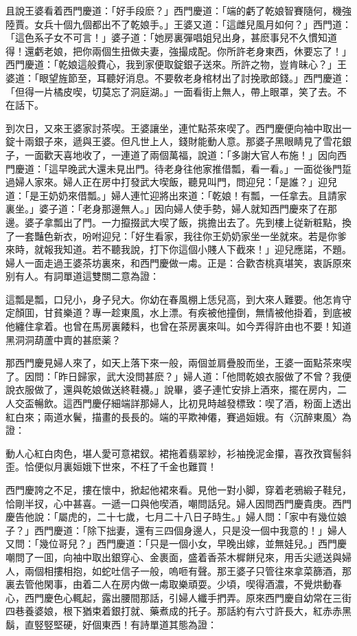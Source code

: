 且說王婆看着西門慶道：「好手段麽？」西門慶道：「端的虧了乾娘智賽隨何，機強陸賈。女兵十個九個都出不了乾娘手。」王婆又道：「這雌兒風月如何？」西門道：「這色系子女不可言！」婆子道：「她房裏彈唱姐兒出身，甚麽事兒不久慣知道得！還虧老娘，把你兩個生扭做夫妻，強撮成配。你所許老身東西，休要忘了！」西門慶道：「乾娘這般費心，我到家便取錠銀子送來。所許之物，豈肯昧心？」王婆道：「眼望旌節至，耳聽好消息。不要敎老身棺材出了討挽歌郎錢。」西門慶道：「但得一片橘皮喫，切莫忘了洞庭湖。」一面看街上無人，帶上眼罩，笑了去。不在話下。

到次日，又來王婆家討茶喫。王婆讓坐，連忙點茶來喫了。西門慶便向袖中取出一錠十兩銀子來，遞與王婆。但凡世上人，錢財能動人意。那婆子黑眼睛見了雪花銀子，一面歡天喜地收了，一連道了兩個萬福，說道：「多謝大官人布施！」因向西門慶道：「這早晚武大還未見出門。待老身往他家推借瓢，看一看。」一面從後門踅過婦人家來。婦人正在房中打發武大喫飯，聽見叫門，問迎兒：「是誰？」迎兒道：「是王奶奶來借瓢。」婦人連忙迎將出來道：「乾娘！有瓢，一任拿去。且請家裏坐。」婆子道：「老身那邊無人。」因向婦人使手勢，婦人就知西門慶來了在那邊。婆子拿瓢出了門。一力攛掇武大喫了飯，挑擔出去了。先到樓上従新粧點，換了一套豔色新衣，吩咐迎兒：「好生看家，我往你王奶奶家坐一坐就來。若是你爹來時，就報我知道。若不聽我說，打下你這個小賤人下截來！」迎兒應諾，不題。婦人一面走過王婆茶坊裏來，和西門慶做一䖏。正是：合歡杏桃真堪笑，衷訴原來别有人。有詞單道這雙關二意為證：

這瓢是瓢，口兒小，身子兒大。你幼在春風棚上恁兒高，到大來人難要。他怎肯守定顏囬，甘貧樂道？專一趁東風，水上漂。有疾被他撞倒，無情被他掛着，到底被他纏住拿着。也曾在馬房裏餧料，也曾在茶房裏來叫。如今弄得許由也不要！知道黑洞洞葫蘆中賣的甚麽薬？

那西門慶見婦人來了，如天上落下來一般，兩個並肩疊股而坐，王婆一面點茶來喫了。因問：「昨日歸家，武大没問甚麽？」婦人道：「他問乾娘衣服做了不曾？我便說衣服做了，還與乾娘做送終鞋襪。」說畢，婆子連忙安排上酒來，擺在房内，二人交盃暢飲。這西門慶仔細端詳那婦人，比初見時越發標致：喫了酒，粉面上透出紅白來；兩道水鬢，描畫的長長的。端的平欺神僊，賽過姮娥。有〈沉醉東風〉為證：

動人心紅白肉色，堪人愛可意裙釵。裙拖着翡翠紗，衫袖挽泥金攥，喜孜孜寳髻斜歪。恰便似月裏姮娥下世來，不枉了千金也難買！

西門慶誇之不足，摟在懷中，掀起他裙來看。見他一對小脚，穿着老鴉緞子鞋兒，恰剛半扠，心中甚喜。一遞一口與他喫酒，嘲問話兒。婦人因問西門慶貴庚。西門慶告他說：「屬虎的，二十七歲，七月二十八日子時生。」婦人問：「家中有幾位娘子？」西門慶道：「除下拙妻，還有三四個身邊人，只是没一個中我意的！」婦人又問：「幾位哥兒？」西門慶道：「只是一個小女，早晚出嫁，並無娃兒。」西門慶嘲問了一囬，向袖中取出銀穿心、金裹面，盛着香茶木樨餅兒來，用舌尖遞送與婦人，兩個相摟相抱，如蛇吐信子一般，嗚咂有聲。那王婆子只管往來拿菜篩酒，那裏去管他閑事，由着二人在房内做一䖏取樂頑耍。少頃，喫得酒濃，不覺烘動春心，西門慶色心輒起，露出腰間那話，引婦人纖手捫弄。原來西門慶自幼常在三街四巷養婆娘，根下猶束着銀打就、藥煮成的托子。那話約有六寸許長大，紅赤赤黑鬍，直竪竪堅硬，好個東西！有詩單道其態為證：

